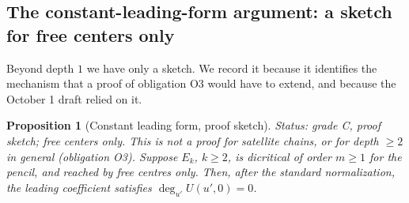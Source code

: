 \documentclass[a4paper,11pt]{article}
\theoremstyle{jsplain}
\newtheorem{proposition}[theorem]{Proposition}
\theoremstyle{jsdef}
\theoremstyle{jsrem}
\begin{document}
\subsection{The constant-leading-form argument: a sketch for free centers only}\label{td:sec:constant-form}

Beyond depth $1$ we have only a sketch. We record it because it identifies the mechanism that a
proof of obligation O3 would have to extend, and because the October 1 draft relied on it.

\begin{proposition}[Constant leading form, proof sketch]\label{td:prop:constant-form}
\textit{Status: grade C, proof sketch; free centers only. This is not a proof for satellite
chains, or for depth $\geq 2$ in general (obligation O3).}
Suppose $E_k$, $k \geq 2$, is dicritical of order $m \geq 1$ for the pencil, and reached by free
centres only. Then, after the standard normalization, the leading coefficient satisfies
$\deg_{u'} U(u',0) = 0$.
\end{proposition}
\end{document}
